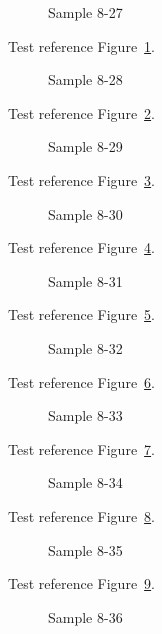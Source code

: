 \begin{figure}[tbhp]
\caption{Sample 8-27}
\label{fig:sample-8-27}
\end{figure}

Test reference Figure~\ref{fig:sample-8-27}.

\begin{figure}[tbhp]
\caption{Sample 8-28}
\label{fig:sample-8-28}
\end{figure}

Test reference Figure~\ref{fig:sample-8-28}.

\begin{figure}[tbhp]
\caption{Sample 8-29}
\label{fig:sample-8-29}
\end{figure}

Test reference Figure~\ref{fig:sample-8-29}.

\begin{figure}[tbhp]
\caption{Sample 8-30}
\label{fig:sample-8-30}
\end{figure}

Test reference Figure~\ref{fig:sample-8-30}.

\begin{figure}[tbhp]
\caption{Sample 8-31}
\label{fig:sample-8-31}
\end{figure}

Test reference Figure~\ref{fig:sample-8-31}.

\begin{figure}[tbhp]
\caption{Sample 8-32}
\label{fig:sample-8-32}
\end{figure}

Test reference Figure~\ref{fig:sample-8-32}.

\begin{figure}[tbhp]
\caption{Sample 8-33}
\label{fig:sample-8-33}
\end{figure}

Test reference Figure~\ref{fig:sample-8-33}.

\begin{figure}[tbhp]
\caption{Sample 8-34}
\label{fig:sample-8-34}
\end{figure}

Test reference Figure~\ref{fig:sample-8-34}.

\begin{figure}[tbhp]
\caption{Sample 8-35}
\label{fig:sample-8-35}
\end{figure}

Test reference Figure~\ref{fig:sample-8-35}.

\begin{figure}[tbhp]
\caption{Sample 8-36}
\label{fig:sample-8-36}
\end{figure}

